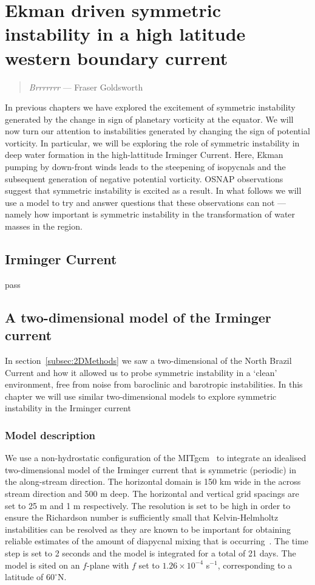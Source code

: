 \chapter{Ekman driven symmetric instability in a high latitude western boundary current}
\label{chap:5}
\begin{quote}
    \textit{Brrrrrrr} --- Fraser Goldsworth
\end{quote}

In previous chapters we have explored the excitement of symmetric instability generated by the change in sign of planetary vorticity at the equator. We will now turn our attention to instabilities generated by changing the sign of potential vorticity. In particular, we will be exploring the role of symmetric instability in deep water formation in the high-lattitude Irminger Current. Here, Ekman pumping by down-front winds leads to the steepening of isopycnals and the subsequent generation of negative potential vorticity. OSNAP observations suggest that symmetric instability is excited as a result. In what follows we will use a model to try and answer questions that these observations can not --- namely how important is symmetric instability in the transformation of water masses in the region.

\section{Irminger Current}
pass
\section{A two-dimensional model of the Irminger current}
In section~\ref{subsec:2DMethods} we saw a two-dimensional of the North Brazil Current and how it allowed us to probe symmetric instability in a `clean' environment, free from noise from baroclinic and barotropic instabilities. In this chapter we will use similar two-dimensional models to explore symmetric instability in the Irminger current
\subsection{Model description}
We use a non-hydrostatic configuration of the MITgcm~\citep{Marshall1997} to integrate an idealised two-dimensional model of the Irminger current that is symmetric (periodic) in the along-stream direction. The horizontal domain is 150 km wide in the across stream direction and 500 m deep. The horizontal and vertical grid spacings are set to 25 m and 1 m respectively. The resolution is set to be high in order to ensure the Richardson number is sufficiently small that Kelvin-Helmholtz instabilities can be resolved as they are known to be important for obtaining reliable estimates of the amount of diapycnal mixing that is occurring~\citep{Griffiths2003a, Yankovsky2019}. The time step is set to 2 seconds and the model is integrated for a total of 21 days. The model is sited on an $f$-plane with $f$ set to $1.26 \times 10^{-4}$ s$^{-1}$, corresponding to a latitude of $60^\circ$N. 

